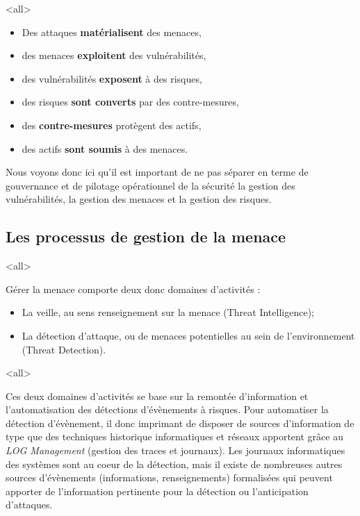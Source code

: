 
\mode<all>{}

\begin{itemize}
  \item Des attaques \textbf{matérialisent} des menaces,
  \item des menaces \textbf{exploitent} des vulnérabilités,
  \item des vulnérabilités \textbf{exposent} à des risques,
  \item des risques\textbf{ sont converts }par des contre-mesures,
  \item des \textbf{contre-mesures }protègent des actifs,
  \item des actifs \textbf{sont  soumis }à  des menaces.
\end{itemize}

Nous voyons donc ici qu'il est important de ne pas séparer en terme de gouvernance et de pilotage opérationnel de la sécurité la gestion des vulnérabilités, la gestion des menaces et la gestion des risques.




\subsection{Les processus de gestion de la menace}

\mode<all>{
{
Gérer la menace comporte deux donc domaines d'activités :
\begin{itemize}
  \item La veille, au sens renseignement sur la menace (Threat Intelligence);
  \item La détection d'attaque, ou de menaces potentielles au sein de l'environnement (Threat Detection).
\end{itemize}
}}%

\mode<all>{}

Ces deux domaines d'activités se base sur la remontée d'information et l'automatisation des détections d'évènements à risques.  Pour automatiser la détection d'évènement, il donc imprimant de disposer de sources d'information de type  que des techniques historique informatiques et réseaux  apportent grâce au \textit{LOG  Management} (gestion des traces et journaux). Les journaux informatiques des systèmes sont au coeur de la détection, mais il existe de nombreuses autres sources d'évènements (informations,  renseignements) formalisées qui peuvent apporter de l'information pertinente pour la détection ou l'anticipation d'attaques.

